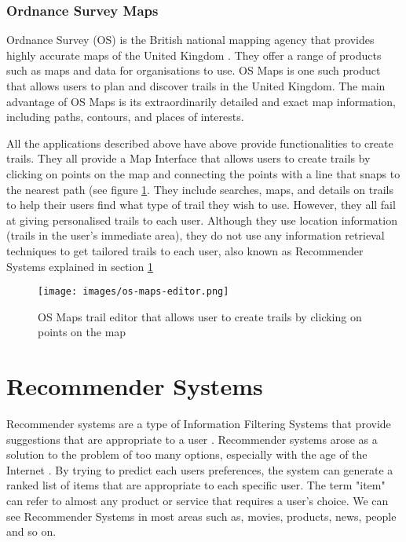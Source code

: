 \subsubsection{Ordnance Survey Maps} 
Ordnance Survey (OS) is the British national mapping agency that provides highly accurate maps of the United Kingdom \cite{wiki:OrdinanceSurvey}.  They offer a range of products such as maps and data for organisations to use.  OS Maps \cite{osmaps} is one such product that allows users to plan and discover trails in the United Kingdom.  The main advantage of OS Maps is its extraordinarily detailed and exact map information, including paths, contours, and places of interests.


All the applications described above have above provide functionalities to create trails. They all provide a Map Interface that allows users to create trails by clicking on points on the map and connecting the points with a line that snaps to the nearest path (see figure \ref{fig:osMapsEditor}. They include searches, maps, and details on trails to help their users find what type of trail they wish to use. However, they all fail at giving personalised trails to each user. Although they use location information (trails in the user's immediate area), they do not use any information retrieval techniques to get tailored trails to each user, also known as Recommender Systems explained in section \ref{sec:RecSystems}

\begin{figure}[ht]
    \centering
    \texttt{[image: images/os-maps-editor.png]}
    \caption{OS Maps trail editor that allows user to create trails by clicking on points on the map}
    \label{fig:osMapsEditor}
\end{figure}

\section{Recommender Systems} \label{sec:RecSystems}
Recommender systems are a type of Information Filtering Systems that provide suggestions that are appropriate to a user \cite{ricci2011introduction}.  Recommender systems arose as a solution to the problem of too many options, especially with the age of the Internet \cite{rishabh2019recommender}.  By trying to predict each users preferences, the system can generate a ranked list of items that are appropriate to each specific user.  The term "item" can refer to almost any product or service that requires a user’s choice. We can see  Recommender Systems in most areas such as,  movies,  products, news, people and so on.

